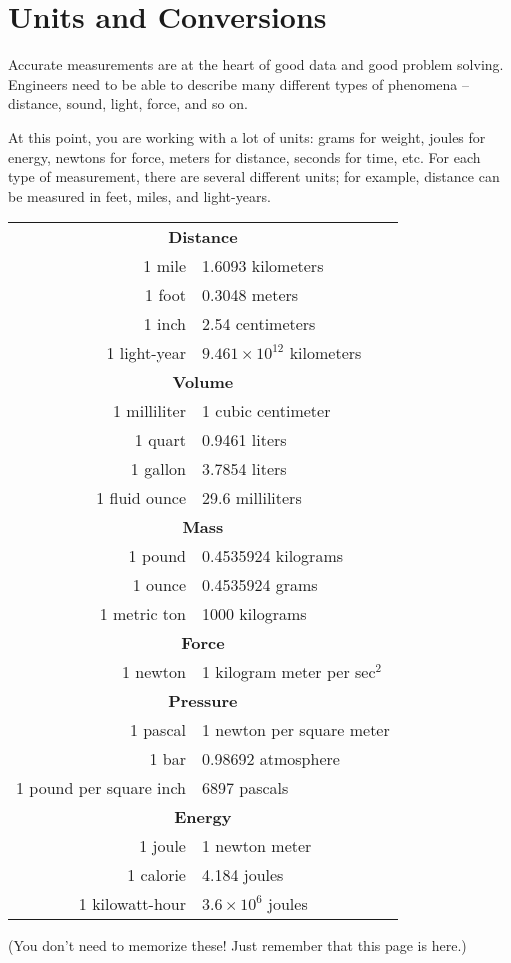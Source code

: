 \chapter{Units and Conversions}

Accurate measurements are at the heart of good data and good problem solving. Engineers need to be able to describe many different types of phenomena -- distance, sound, light, force, and so on. 

At this point, you are working with a lot of units: grams for weight,
joules for energy, newtons for force, meters for distance, seconds for
time, etc. For each type of measurement, there are several different
units; for example, distance can be measured in feet, miles,
and light-years.

\begin{mdframed}[style=important, frametitle={Some Equalencies}]

\begin{tabular}{r | l}
  \hline
  \multicolumn{2}{c}{\textbf{Distance}}\\
  1 mile & 1.6093 kilometers \\
  1 foot & 0.3048 meters \\
  1 inch & 2.54 centimeters \\
  1 light-year & $9.461 \times 10^{12}$ kilometers\\
  \hline
  \multicolumn{2}{c}{\textbf{Volume}}\\
  1 milliliter & 1 cubic centimeter \\
  1 quart & 0.9461 liters \\
  1 gallon & 3.7854 liters \\
  1 fluid ounce & 29.6 milliliters \\
  \hline
  \multicolumn{2}{c}{\textbf{Mass}}\\
  1 pound & 0.4535924 kilograms\\
  1 ounce & 0.4535924 grams\\
  1 metric ton & 1000 kilograms \\
  \hline
  \multicolumn{2}{c}{\textbf{Force}}\\
  1 newton & 1 kilogram meter per sec$^2$\\
  \hline
  \multicolumn{2}{c}{\textbf{Pressure}}\\
  1 pascal & 1 newton per square meter \\
  1 bar & 0.98692 atmosphere \\
  1 pound per square inch & 6897 pascals \\
  \hline
  \multicolumn{2}{c}{\textbf{Energy}}\\
  1 joule & 1 newton meter \\
  1 calorie & 4.184 joules \\
  1 kilowatt-hour & $3.6 \times 10^{6}$ joules  \\
\end{tabular}

(You don't need to memorize these! Just remember that this page is here.)

\end{mdframed}

